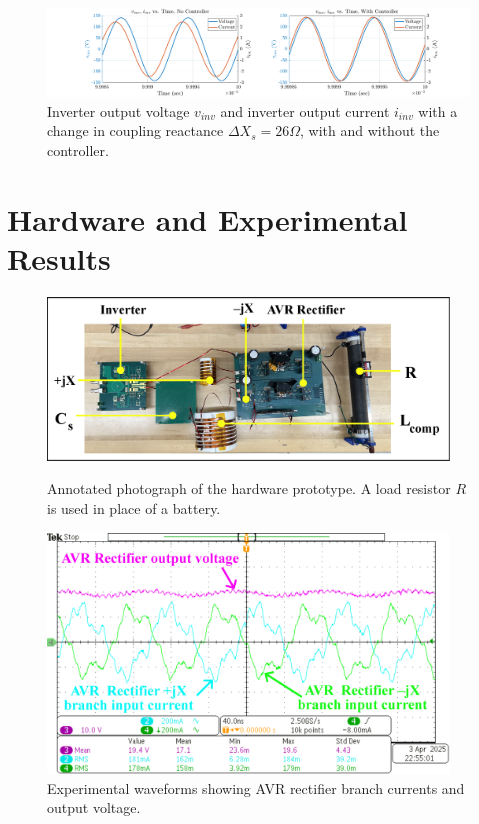 \documentclass[journal, onecolumn, final, letterpaper, 11pt]{IEEEtran}
\begin{document}
\begin{figure}[!b]
	\centering
	\includegraphics[width=\textwidth]{figures/input_waveforms_with_without_control.png}
	\caption{Inverter output voltage $v_{inv}$ and inverter output current $i_{inv}$ with a change in coupling reactance $\Delta X_s = 26 \Omega$, with and without the controller.}
	\label{fig:input_waveforms}
\end{figure}

\section{Hardware and Experimental Results}
\label{sec:hardware}

\begin{figure}[t]
\centering
\begin{minipage}{.55\textwidth}
  \centering
  \includegraphics[width=0.95\textwidth]{figures/prototype_annotated_eps.eps}
	\caption{Annotated photograph of the hardware prototype. A load resistor $R$ is used in place of a battery.}
  \label{fig:hardware_prototype}
\end{minipage}%
\begin{minipage}{0.45\textwidth}
  \centering
  \includegraphics[width=0.95\textwidth]{figures/avr_waveforms_annotated_eps.eps}
	\caption{Experimental waveforms showing AVR rectifier branch currents and output voltage.}
  \label{fig:waveform}
\end{minipage}
\vspace{-0.4cm}
\end{figure}
\end{document}
